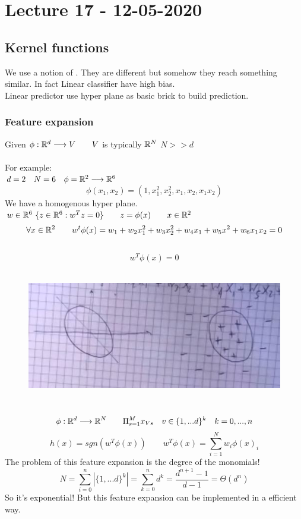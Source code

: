 \documentclass[../main.tex]{subfiles}
\begin{document}
\chapter{Lecture 17 - 12-05-2020}

\section{Kernel functions}

We use a notion of . They are different but somehow they reach something similar. In fact Linear classifier have high bias.
\\
Linear predictor use hyper plane as basic brick to build prediction.

\subsection{Feature expansion}
Given $\phi : \mathbb{R}^d \longrightarrow V \qquad V$ is typically $\mathbb{R}^N$ \quad $N >> d$
\\\\
For example:\\
$d = 2 \quad N = 6 \quad \phi = \mathbb{R}^2 \longrightarrow \mathbb{R}^6 \quad$ $$\phi(x_1,x_2) = (1,x_1^2,x_2^2,x_1,x_2,x_1 x_2)$$
We have a homogenous hyper plane.
\\
$w \in \mathbb{R}^6 \ \{ z \in \mathbb{R}^6 : w^T z = 0 \} \qquad z = \phi(x) \qquad x \in \mathbb{R}^2$
\\
$$
\forall x \in \mathbb{R}^2 \qquad w^t \phi(x) = w_1+w_2 x_1^2 + w_3 x_2^2 + w_4 x_1 + w_5 x^2 + w_6 x_1 x_2 = 0
$$\
$$
w^T \phi(x) = 0 
$$\\
\begin{figure}[h]
    \centering
    \includegraphics[width=0.6\linewidth]{../img/lez17-img1.JPG}
    \caption{} 
\end{figure}\\
$$
\phi : \mathbb{R}^d \longrightarrow \mathbb{R}^N \qquad \Pi_{s=1}^{M} x_{Vs} \quad v \in \{1,...d\}^k \quad k = 0, ..., n 
$$
$$
h(x) = sgn (w^T \phi(x)) \qquad w^T \phi(x) = \sum_{i= 1}^{N} w_i \phi(x)_i
$$
The problem of this feature expansion is the degree of the monomials!
\\
$$
N = \sum_{i = 0}^{n} | \{ 1,...d \}^k | = \sum_{k = 0}^{n} d^k  = \frac{d^{n+1}-1}{d-1} = \Theta (d^n)
$$
So it's exponential! But this feature expansion can be implemented in a efficient way.
\end{document}
